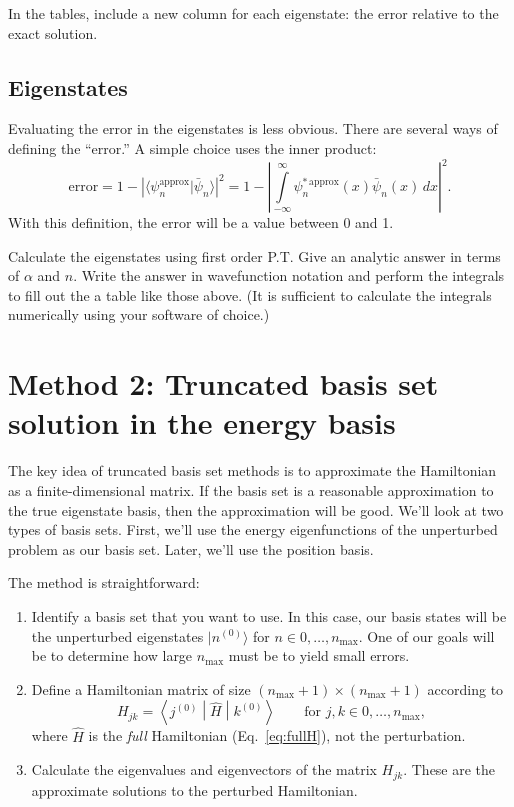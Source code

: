 \documentclass[fontsize=11pt,paper=letter,twoside=false,onecolumn]{article} %
\begin{document}
In the tables, include a new column for each eigenstate: the error relative to the exact solution.

\subsection{Eigenstates}
Evaluating the error in the eigenstates is less obvious.  There are several ways of defining the ``error.''  A simple choice uses the inner product:
\[
\text{error} = 1-\left| \langle \psi^{\text{approx}}_n | \bar{\psi}_n\rangle \right|^2 = 1-\left| \int\limits_{-\infty}^\infty \psi^{*\,\text{approx}}_n(x)
\bar{\psi}_n(x)\,dx \right|^2.
\]
With this definition, the error will be a value between 0 and 1.

Calculate the eigenstates using first order P.T.
Give an analytic answer in terms of $\alpha$ and $n$.
Write the answer in wavefunction notation and perform the integrals to fill out the a table like those above.
(It is sufficient to calculate the integrals numerically using your software of choice.)

\section{Method 2: Truncated basis set solution in the energy basis}
The key idea of truncated basis set methods is to approximate the Hamiltonian as a finite-dimensional matrix.
If the basis set is a reasonable approximation to the true eigenstate basis, then the approximation will be good.
We'll look at two types of basis sets.
First, we'll use the energy eigenfunctions of the unperturbed problem as our basis set.
Later, we'll use the position basis.

\vspace*{1ex}
\noindent The method is straightforward:
\begin{enumerate}
\item Identify a basis set that you want to use.  In this case, our basis states will be the unperturbed eigenstates $| n^{(0)}\rangle $ for $n\in 0,\ldots, n_\text{max}$.  One of our goals will be to determine how large $n_\text{max}$ must be to yield small errors.
\item Define a Hamiltonian matrix of size $(n_\text{max}+1) \times (n_\text{max}+1)$ according to
\[
H_{jk} = \left<j^{(0)} \middle\vert \hat{H} \middle\vert k^{(0)} \right>\qquad\text{for }j,k \in 0,\ldots, n_\text{max},
\]
where $\hat{H}$ is the \emph{full} Hamiltonian (Eq.~\eqref{eq:fullH}), not the perturbation.
\item Calculate the eigenvalues and eigenvectors of the matrix $H_{jk}$.  These are the approximate solutions to the perturbed Hamiltonian.
\end{enumerate}
\end{document}
